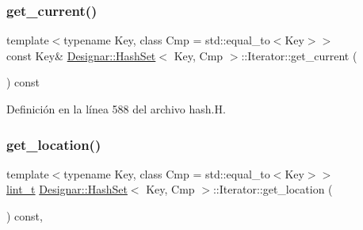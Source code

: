 \mbox{\label{class_designar_1_1_hash_set_1_1_iterator_aed6b09996733067a2aa5e48b702ba9a2}} 
\subsubsection{\texorpdfstring{get\+\_\+current()}{get\_current()}\hspace{0.1cm}{\footnotesize\ttfamily [2/2]}}
{\footnotesize\ttfamily template$<$typename Key, class Cmp = std\+::equal\+\_\+to$<$\+Key$>$$>$ \\
const Key\& \hyperlink{class_designar_1_1_hash_set}{Designar\+::\+Hash\+Set}$<$ Key, Cmp $>$\+::Iterator\+::get\+\_\+current (\begin{DoxyParamCaption}{ }\end{DoxyParamCaption}) const\hspace{0.3cm}{\ttfamily [inline]}}



Definición en la línea 588 del archivo hash.\+H.

\mbox{\label{class_designar_1_1_hash_set_1_1_iterator_a8616bd592e20ebadab10de5c78a56eda}} 
\subsubsection{\texorpdfstring{get\+\_\+location()}{get\_location()}}
{\footnotesize\ttfamily template$<$typename Key, class Cmp = std\+::equal\+\_\+to$<$\+Key$>$$>$ \\
\hyperlink{namespace_designar_a9d113d66a39e82b73727c72cd3a52f73}{lint\+\_\+t} \hyperlink{class_designar_1_1_hash_set}{Designar\+::\+Hash\+Set}$<$ Key, Cmp $>$\+::Iterator\+::get\+\_\+location (\begin{DoxyParamCaption}{ }\end{DoxyParamCaption}) const\hspace{0.3cm}{\ttfamily [inline]}, {\ttfamily [protected]}}



